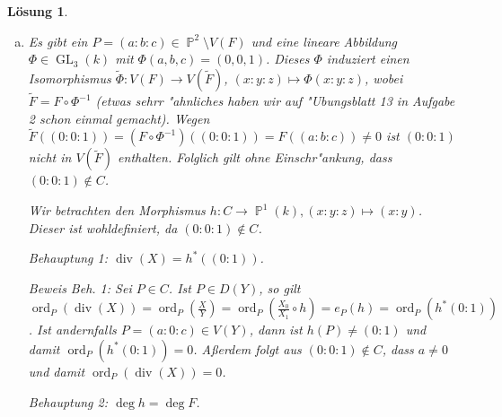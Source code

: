 \documentclass[a4paper, 12pt, numbers=noendperiod, chapterprefix=true]{scrbook}
\theoremstyle{break}
\newtheorem{Loes}{L\"osung}
\theoremstyle{nonumberbreak}
\theoremstyle{nonumberplain}
\DeclareMathOperator{\GL}{GL}
\DeclareMathOperator{\Divisor}{div}
\DeclareMathOperator{\ord}{ord}
\newcommand{\A}{\mathbb{A}}
\DeclareMathOperator{\Projective}{\mathbb{P}} %
\begin{document}
\begin{Loes}
\begin{enumerate}[a)]
\begin{figure}[h]
		\caption{$C\cap D(Y)$ mit $V(Z)$ ($x$-Achse).}
		\label{fig:DY}
	\end{figure}
\item
	Es gibt ein $P =(a:b:c)\in \Projective^2\setminus V(F)$ und eine lineare Abbildung $\Phi \in \GL_3(k)$ mit $\Phi(a,b,c) = (0,0,1)$. Dieses $\Phi$ induziert einen Isomorphismus $\tilde{\Phi} \colon V(F) \to V(\tilde{F})$, $(x:y:z) \mapsto \Phi(x:y:z)$, wobei $\tilde{F} = F \circ \Phi^{-1}$ (etwas sehrr "ahnliches haben wir auf "Ubungsblatt 13 in Aufgabe 2 schon einmal gemacht). Wegen $\tilde{F}((0:0:1)) = (F \circ \Phi^{-1})((0:0:1)) = F((a:b:c)) \neq 0$ ist $(0:0:1)$ nicht in $V(\tilde{F})$ enthalten. Folglich gilt ohne Einschr"ankung, dass $(0:0:1) \notin C$.

	Wir betrachten den Morphismus $h: C \to \Projective^1(k), (x:y:z) \mapsto(x:y)$. Dieser ist wohldefiniert, da $(0:0:1) \notin C$.

	\emph{Behauptung 1:} $\Divisor(X) = h^\ast((0:1))$.

	\emph{Beweis Beh. 1:} Sei $P\in C$. Ist $P \in D(Y)$, so gilt $\ord_P(\Divisor(X)) = \ord_P(\frac{X}{Y}) = \ord_P(\frac{X_0}{X_1} \circ h) = e_P(h) = \ord_P(h^\ast(0:1))$. Ist andernfalls $P = (a:0:c) \in V(Y)$, dann ist $h(P) \neq (0:1)$ und damit $\ord_P(h^\ast(0:1)) = 0$. A\ss erdem folgt aus $(0:0:1)\notin C$, dass $a \neq 0$ und damit $\ord_P(\Divisor(X)) = 0$.

	\emph{Behauptung 2:} $\deg h = \deg F$. 


\end{enumerate}
\end{Loes}
\end{document}
